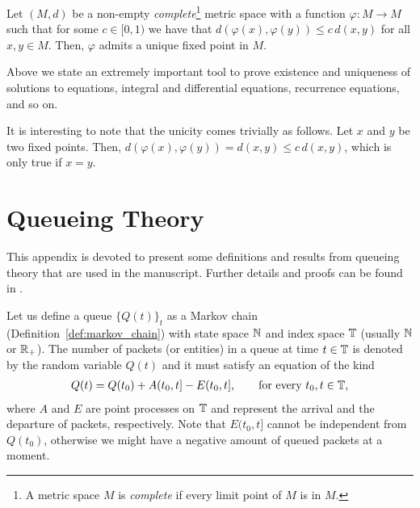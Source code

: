 \begin{theorem} \label{th:banach}
    Let $(M,d)$ be a non-empty \textit{complete}\footnote{A metric space $M$ is \textit{complete} if every limit point of $M$ is in $M$.} metric space with a function $\varphi:M\longrightarrow M$ such that for some $c\in[0,1)$ we have that $d(\varphi(x),\varphi(y))\le c\,d(x,y)$ for all $x,y\in M$.
    Then, $\varphi$ admits a unique fixed point in $M$.
\end{theorem}

Above we state an extremely important tool to prove existence and uniqueness of solutions to equations, integral and differential equations, recurrence equations, and so on.

It is interesting to note that the unicity comes trivially as follows.
%
Let $x$ and $y$ be two fixed points. Then, $d(\varphi(x),\varphi(y)) = d(x,y) \le c\,d(x,y)$, which is only true if $x=y$.

\chapter{Queueing Theory}

This appendix is devoted to present some definitions and results from queueing theory that are used in the manuscript.
%
Further details and proofs can be found in \cite{baccelli2013elements}.

Let us define a queue $\{Q(t)\}_t$ as a Markov chain (Definition~\ref{def:markov_chain}) with state space ${\mathbb N}$ and index space ${\mathbb T}$ (usually ${\mathbb N}$ or ${\mathbb R}_+$).
%
The number of packets (or entities) in a queue at time $t\in {\mathbb T}$ is denoted by the random variable $Q(t)$ and it must satisfy an equation of the kind
\begin{align}
    Q(t) = Q(t_0) + A(t_0,t] - E(t_0,t], \qquad \text{for every}~ t_0,t\in{\mathbb T},
\end{align}
where $A$ and $E$ are point processes on ${\mathbb T}$ and represent the arrival and the departure of packets, respectively.
%
Note that $E(t_0,t]$ cannot be independent from $Q(t_0)$, otherwise we might have a negative amount of queued packets at a moment.

